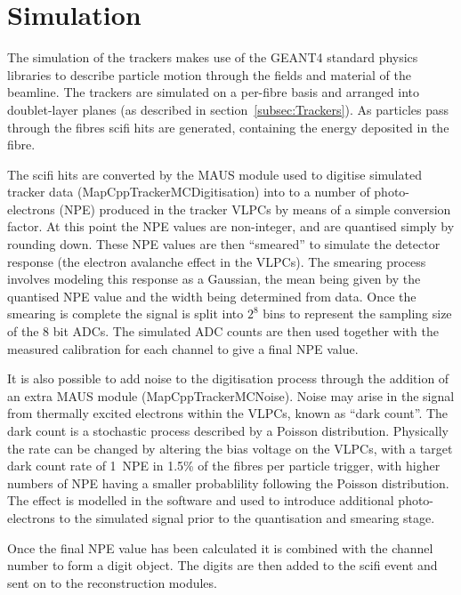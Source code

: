 \section{Simulation}
\label{sec:Simulation}

The simulation of the trackers makes use of the GEANT4 standard physics libraries to describe particle motion through the fields and material of the beamline. The trackers are simulated on a per-fibre basis and arranged into doublet-layer planes (as described in section~\ref{subsec:Trackers}). As particles pass through the fibres scifi hits are generated, containing the energy deposited in the fibre. 

The scifi hits are converted by the MAUS module used to digitise simulated tracker data (MapCppTrackerMCDigitisation) into to a number of photo-electrons (NPE) produced in the tracker VLPCs by means of a simple conversion factor. At this point the NPE values are non-integer, and are quantised simply by rounding down. These NPE values are then ``smeared'' to simulate the detector response (the electron avalanche effect in the VLPCs). The smearing process involves modeling this response as a Gaussian, the mean being given by the quantised NPE value and the width being determined from data. Once the smearing is complete the signal is split into $2^8$ bins to represent the sampling size of the 8 bit ADCs. The simulated ADC counts are then used together with the measured calibration for each channel to give a final NPE value.

It is also possible to add noise to the digitisation process through the addition of an extra MAUS module (MapCppTrackerMCNoise). Noise may arise in the signal from thermally excited electrons within the VLPCs, known as ``dark count''. The dark count is a stochastic process described by a Poisson distribution. Physically the rate can be changed by altering the bias voltage on the VLPCs, with a target dark count rate of 1~NPE in 1.5\% of the fibres per particle trigger, with higher numbers of NPE having a smaller probablility following the Poisson distribution. The effect is modelled in the software and used to introduce additional photo-electrons to the simulated signal prior to the quantisation and smearing stage. 

Once the final NPE value has been calculated it is combined with the channel number to form a digit object. The digits are then added to the scifi event and sent on to the reconstruction modules.



